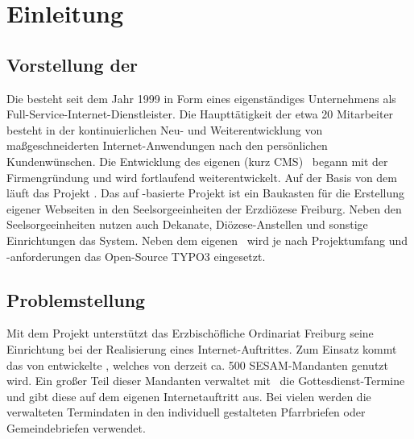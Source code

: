 \chapter{Einleitung}\label{einleitung}
\section{Vorstellung der \webco}
Die \webco besteht seit dem Jahr 1999 in Form eines eigenständiges Unternehmens als Full-Service-Internet-Dienstleister. Die Haupttätigkeit der etwa 20 Mitarbeiter besteht in der kontinuierlichen Neu- und Weiterentwicklung von maßgeschneiderten Internet-Anwendungen nach den persönlichen Kundenwünschen. Die Entwicklung des eigenen \cms (kurz CMS) \edith \, begann mit der Firmengründung und wird fortlaufend weiterentwickelt. Auf der Basis von dem \cmsEdith\, läuft das Projekt \qmUO{\sesam}. 
\abschnitt
Das auf \edith-basierte Projekt \qmUO{\sesam} ist ein Baukasten für die Erstellung eigener Webseiten in den Seelsorgeeinheiten der Erzdiözese Freiburg. Neben den Seelsorgeeinheiten nutzen auch Dekanate, Diözese-Anstellen und sonstige Einrichtungen das System.
\abschnitt
Neben dem eigenen \cmsEdith\, wird je nach Projektumfang und -anforderungen das Open-Source \cms TYPO3 eingesetzt.


\section{Problemstellung} \label{problemstellung}
Mit dem Projekt  unterstützt das Erzbischöfliche Ordinariat Freiburg seine Einrichtung bei der Realisierung eines Internet-Auftrittes. Zum Einsatz kommt das von \webco entwickelte \cmsEdith, welches von derzeit ca. 500 SESAM-Mandanten genutzt wird.
\abschnitt
Ein großer Teil dieser Mandanten verwaltet mit \edith\, die Gottesdienst-Termine und gibt diese auf dem eigenen Internetauftritt aus. Bei vielen werden die verwalteten Termindaten in den individuell gestalteten Pfarrbriefen oder Gemeindebriefen verwendet.


